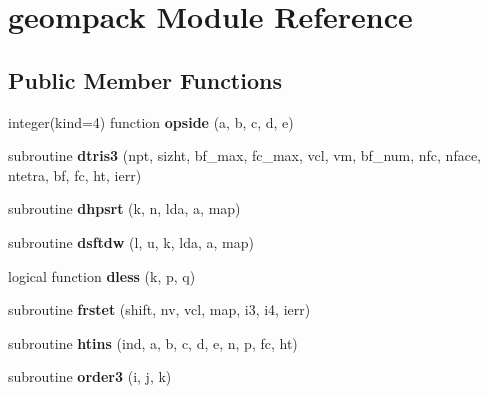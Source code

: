 \hypertarget{classgeompack}{\section{geompack Module Reference}
\label{classgeompack}
}
\subsection*{Public Member Functions}
\begin{DoxyCompactItemize}
\item 
\hypertarget{classgeompack_a2317ab8af14e0fa670245b6d67ed7b60}{integer(kind=4) function {\bfseries opside} (a, b, c, d, e)}\label{classgeompack_a2317ab8af14e0fa670245b6d67ed7b60}

\item 
\hypertarget{classgeompack_a6285805baeace70de928605567d0ea99}{subroutine {\bfseries dtris3} (npt, sizht, bf\-\_\-max, fc\-\_\-max, vcl, vm, bf\-\_\-num, nfc, nface, ntetra, bf, fc, ht, ierr)}\label{classgeompack_a6285805baeace70de928605567d0ea99}

\item 
\hypertarget{classgeompack_a7a0dea21fde829963eb4ef699df1cafc}{subroutine {\bfseries dhpsrt} (k, n, lda, a, map)}\label{classgeompack_a7a0dea21fde829963eb4ef699df1cafc}

\item 
\hypertarget{classgeompack_a23717a1d896374a24d14b4ca0c792e1f}{subroutine {\bfseries dsftdw} (l, u, k, lda, a, map)}\label{classgeompack_a23717a1d896374a24d14b4ca0c792e1f}

\item 
\hypertarget{classgeompack_a9614867a3a0edc826e6fb078cb07976c}{logical function {\bfseries dless} (k, p, q)}\label{classgeompack_a9614867a3a0edc826e6fb078cb07976c}

\item 
\hypertarget{classgeompack_a7f34140747c618d0e2392452b2e25098}{subroutine {\bfseries frstet} (shift, nv, vcl, map, i3, i4, ierr)}\label{classgeompack_a7f34140747c618d0e2392452b2e25098}

\item 
\hypertarget{classgeompack_a8719c6bd2f3f88cce35c0c64f0328926}{subroutine {\bfseries htins} (ind, a, b, c, d, e, n, p, fc, ht)}\label{classgeompack_a8719c6bd2f3f88cce35c0c64f0328926}

\item 
\hypertarget{classgeompack_ab9a0ea5a4297d18017861d316368cd3a}{subroutine {\bfseries order3} (i, j, k)}\label{classgeompack_ab9a0ea5a4297d18017861d316368cd3a}


\end{DoxyCompactItemize}
